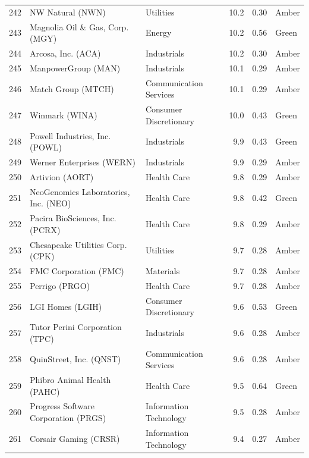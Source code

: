 \documentclass[11pt,a4paper]{article}
\begin{document}
{\begin{longtable}{r p{4.6cm} p{3cm} r r l}
242 & NW Natural (NWN) & Utilities & 10.2 & 0.30 & \cellcolor[HTML]{FFEB9C}Amber \\
243 & Magnolia Oil \& Gas, Corp. (MGY) & Energy & 10.2 & 0.56 & \cellcolor[HTML]{C6EFCE}Green \\
244 & Arcosa, Inc. (ACA) & Industrials & 10.2 & 0.30 & \cellcolor[HTML]{FFEB9C}Amber \\
245 & ManpowerGroup (MAN) & Industrials & 10.1 & 0.29 & \cellcolor[HTML]{FFEB9C}Amber \\
246 & Match Group (MTCH) & Communication Services & 10.1 & 0.29 & \cellcolor[HTML]{FFEB9C}Amber \\
247 & Winmark (WINA) & Consumer Discretionary & 10.0 & 0.43 & \cellcolor[HTML]{C6EFCE}Green \\
248 & Powell Industries, Inc. (POWL) & Industrials & 9.9 & 0.43 & \cellcolor[HTML]{C6EFCE}Green \\
249 & Werner Enterprises (WERN) & Industrials & 9.9 & 0.29 & \cellcolor[HTML]{FFEB9C}Amber \\
250 & Artivion (AORT) & Health Care & 9.8 & 0.29 & \cellcolor[HTML]{FFEB9C}Amber \\
251 & NeoGenomics Laboratories, Inc. (NEO) & Health Care & 9.8 & 0.42 & \cellcolor[HTML]{C6EFCE}Green \\
252 & Pacira BioSciences, Inc. (PCRX) & Health Care & 9.8 & 0.29 & \cellcolor[HTML]{FFEB9C}Amber \\
253 & Chesapeake Utilities Corp. (CPK) & Utilities & 9.7 & 0.28 & \cellcolor[HTML]{FFEB9C}Amber \\
254 & FMC Corporation (FMC) & Materials & 9.7 & 0.28 & \cellcolor[HTML]{FFEB9C}Amber \\
255 & Perrigo (PRGO) & Health Care & 9.7 & 0.28 & \cellcolor[HTML]{FFEB9C}Amber \\
256 & LGI Homes (LGIH) & Consumer Discretionary & 9.6 & 0.53 & \cellcolor[HTML]{C6EFCE}Green \\
257 & Tutor Perini Corporation (TPC) & Industrials & 9.6 & 0.28 & \cellcolor[HTML]{FFEB9C}Amber \\
258 & QuinStreet, Inc. (QNST) & Communication Services & 9.6 & 0.28 & \cellcolor[HTML]{FFEB9C}Amber \\
259 & Phibro Animal Health (PAHC) & Health Care & 9.5 & 0.64 & \cellcolor[HTML]{C6EFCE}Green \\
260 & Progress Software Corporation (PRGS) & Information Technology & 9.5 & 0.28 & \cellcolor[HTML]{FFEB9C}Amber \\
261 & Corsair Gaming (CRSR) & Information Technology & 9.4 & 0.27 & \cellcolor[HTML]{FFEB9C}Amber \\

\end{longtable}}
\end{document}
